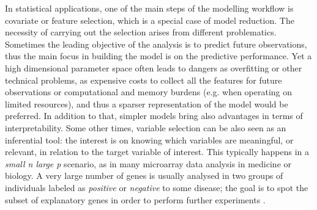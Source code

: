 \documentclass[american,]{article}
\theoremstyle{definition}
\begin{document}
In statistical applications, one of the main steps of the modelling workflow is covariate or feature selection, which is a special case of model reduction. The necessity of carrying out the selection arises from different problematics. Sometimes the leading objective of the analysis is to predict future observations, thus the main focus in building the model is on the predictive performance. Yet a high dimensional parameter space often leads to dangers as overfitting or other technical problems, as expensive costs to collect all the features for future observations or computational and memory burdens (e.g. when operating on limited resources), and thus a sparser representation of the model would be preferred. In addition to that, simpler models bring also advantages in terms of interpretability. Some other times, variable selection can be also seen as an inferential tool: the interest is on knowing which variables are meaningful, or relevant, in relation to the target variable of interest. This typically happens in a \textit{small n large p} scenario, as in many microarray data analysis in medicine or biology. A very large number of genes is usually analysed in two groups of individuals labeled as \textit{positive} or \textit{negative} to some disease; the goal is to spot the subset of explanatory genes in order to perform further experiments \cite[see examples in][]{efron2012large}.
\end{document}
